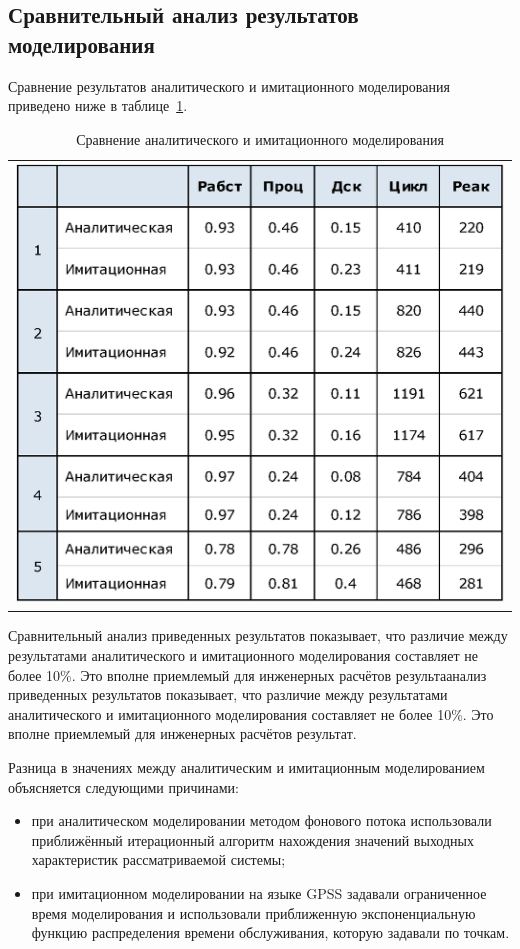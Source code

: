 \newpage

\subsection{Сравнительный анализ результатов моделирования}

Сравнение результатов аналитического и имитационного моделирования приведено ниже в таблице~\ref{table:result_compr}.

\begin{table}[h]
\caption{Сравнение аналитического и имитационного моделирования}
\label{table:result_compr}
\centering
 \begin{tabular}{c}
 \includegraphics[width=0.7\linewidth]{pics/pic12_1_result_compr.eps}
 \end{tabular}
\end{table}

Сравнительный анализ приведенных результатов показывает, что различие между результатами аналитического и имитационного моделирования составляет не более 10\%. Это вполне приемлемый для инженерных расчётов результаанализ приведенных результатов показывает, что различие между результатами аналитического и имитационного моделирования составляет не более 10\%. Это вполне приемлемый для инженерных расчётов результат.\par\bigskip

Разница в значениях между аналитическим и имитационным моделированием объясняется следующими причинами:
\begin{itemize}
\item при аналитическом моделировании методом фонового потока использовали приближённый итерационный алгоритм нахождения значений выходных характеристик рассматриваемой системы;
\item при имитационном моделировании на языке GPSS задавали ограниченное время моделирования и использовали приближенную экспоненциальную функцию распределения времени обслуживания, которую задавали по точкам.
\end{itemize}